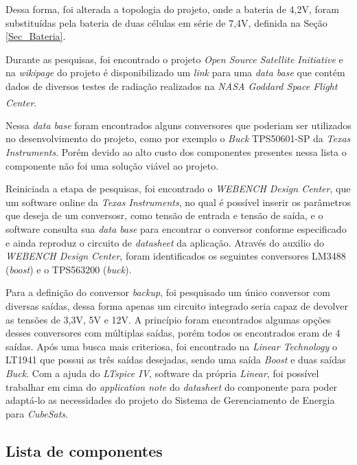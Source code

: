 \documentclass[
	12pt,				%
	openright,			%
	oneside,			%
	a4paper,			%
	english,			%
	french,				%
	spanish,			%
	brazil,				%
	oldfontcommands
	]{abntex2}
\begin{document}
	Dessa forma, foi alterada a topologia do projeto, onde a bateria de 4,2V, foram substituídas pela bateria de duas células em série de 7,4V, definida na Seção \ref{Sec_Bateria}.
	
	Durante as pesquisas, foi encontrado o projeto \textit{Open Source Satellite Initiative} e na \textit{wikipage} do projeto é disponibilizado um \textit{link} para uma \textit{data base} que contém dados de diversos testes de radiação realizados na \textit{NASA Goddard Space Flight Center}.\textsuperscript{\cite{OSSI}}\textsuperscript{\cite{OSSI2}}\textsuperscript{\cite{OSSI3}}
	
	Nessa \textit{data base} foram encontrados alguns conversores que poderiam ser utilizados no desenvolvimento do projeto, como por exemplo o \textit{Buck} TPS50601-SP da \textit{Texas Instruments}. Porém devido ao alto custo dos componentes presentes nessa lista o componente não foi uma solução viável ao projeto.
	
	Reiniciada a etapa de pesquisas, foi encontrado o \textit{WEBENCH Design Center}, que um software online da \textit{Texas Instruments}, no qual é possível inserir os parâmetros que deseja de um conversosr, como tensão de entrada e tensão de saída, e o software consulta sua \textit{data base} para encontrar o conversor conforme especificado e ainda reproduz o circuito de \textit{datasheet} da aplicação. Através do auxilio do \textit{WEBENCH Design Center}, foram identificados os seguintes conversores LM3488 (\textit{boost}) e o TPS563200 (\textit{buck}).
	
	Para a definição do conversor \textit{backup}, foi pesquisado um único conversor com diversas saídas, dessa forma apenas um circuito integrado seria capaz de devolver as tensões de 3,3V, 5V e 12V. A princípio foram encontrados algumas opções desses conversores com múltiplas saídas, porém todos os encontrados eram de 4 saídas. Após uma busca mais criteriosa, foi encontrado na \textit{Linear Technology} o LT1941 que possui as três saídas desejadas, sendo uma saída \textit{Boost} e duas saídas \textit{Buck}. Com a ajuda do \textit{LTspice IV}, software da própria \textit{Linear}, foi possível trabalhar em cima do \textit{application note} do \textit{datasheet} do componente para poder adaptá-lo as necessidades do projeto do Sistema de Gerenciamento de Energia para \textit{CubeSats}.
	
	


\subsection[Lista de componentes]{Lista de componentes}
\end{document}
